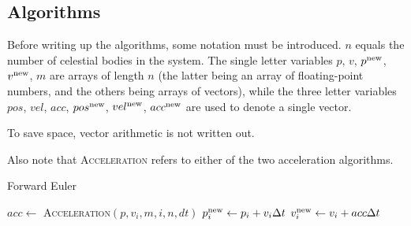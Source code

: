 \documentclass[a4paper]{article}
\begin{document}


\subsection{Algorithms}
\label{subsec:alg}

Before writing up the algorithms, some notation must be introduced.
$n$ equals the number of celestial bodies in the system.
The single letter variables $p$, $v$, $p^{\mathrm{new}}$, $v^{\mathrm{new}}$, $m$ are arrays of length $n$ (the latter being an array of floating-point numbers, and the others being arrays of vectors), while the three letter variables $pos$, $vel$, $acc$, $pos^{\mathrm{new}}$, $vel^{\mathrm{new}}$, $acc^{\mathrm{new}}$ are used to denote a single vector.

To save space, vector arithmetic is not written out.

Also note that \textsc{Acceleration} refers to either of the two acceleration algorithms.

\begin{algorithm}
\caption{Forward Euler} \label{alg:forward_euler}
\begin{algorithmic}[1]
        \State $acc \gets $ \textsc{Acceleration}$(p, v_{i}, m, i, n, dt)$
        \State $p^{\mathrm{new}}_{i} \gets p_{i} + v_{i} {\Delta t}$
        \State $v^{\mathrm{new}}_{i} \gets v_{i} + acc {\Delta t}$
    \EndFor
  \EndProcedure
\end{algorithmic}
\end{algorithm}
\end{document}

